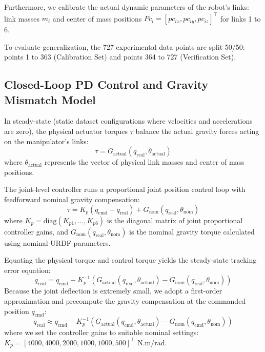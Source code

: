 \documentclass[journal]{IEEEtran}
\begin{document}
Furthermore, we calibrate the actual dynamic parameters of the robot's links: link masses $m_i$ and center of mass positions $Pc_i = [pc_{ix}, pc_{iy}, pc_{iz}]^\top$ for links 1 to 6.

To evaluate generalization, the 727 experimental data points are split 50/50: points 1 to 363 (Calibration Set) and points 364 to 727 (Verification Set).

\subsection{Closed-Loop PD Control and Gravity Mismatch Model}
In steady-state (static dataset configurations where velocities and accelerations are zero), the physical actuator torques $\tau$ balance the actual gravity forces acting on the manipulator's links:
\begin{equation}
    \tau = G_{\text{actual}}(q_{\text{real}}, \theta_{\text{actual}})
\end{equation}
where $\theta_{\text{actual}}$ represents the vector of physical link masses and center of mass positions.

The joint-level controller runs a proportional joint position control loop with feedforward nominal gravity compensation:
\begin{equation}
    \tau = K_p (q_{\text{cmd}} - q_{\text{real}}) + G_{\text{nom}}(q_{\text{real}}, \theta_{\text{nom}})
\end{equation}
where $K_p = \text{diag}(K_{p1}, \dots, K_{p6})$ is the diagonal matrix of joint proportional controller gains, and $G_{\text{nom}}(q_{\text{real}}, \theta_{\text{nom}})$ is the nominal gravity torque calculated using nominal URDF parameters.

Equating the physical torque and control torque yields the steady-state tracking error equation:
\begin{equation}
    q_{\text{real}} = q_{\text{cmd}} - K_p^{-1} \left( G_{\text{actual}}(q_{\text{real}}, \theta_{\text{actual}}) - G_{\text{nom}}(q_{\text{real}}, \theta_{\text{nom}}) \right)
\end{equation}
Because the joint deflection is extremely small, we adopt a first-order approximation and precompute the gravity compensation at the commanded position $q_{\text{cmd}}$:
\begin{equation}
    q_{\text{real}} \approx q_{\text{cmd}} - K_p^{-1} \left( G_{\text{actual}}(q_{\text{cmd}}, \theta_{\text{actual}}) - G_{\text{nom}}(q_{\text{cmd}}, \theta_{\text{nom}}) \right)
\end{equation}
where we set the controller gains to suitable nominal settings: $K_p = [4000, 4000, 2000, 1000, 1000, 500]^\top$ N.m/rad.
\end{document}
